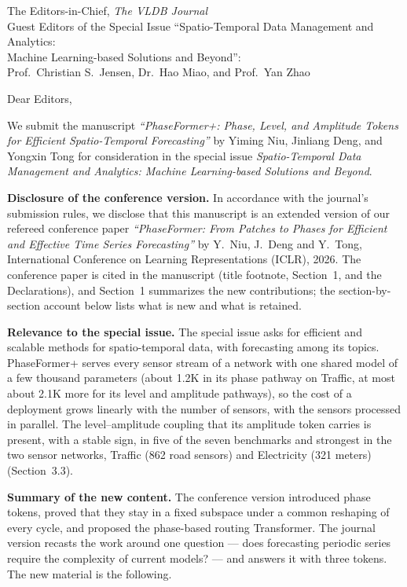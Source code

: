 \documentclass[11pt,a4paper]{letter}
\date{October 2026}
\begin{document}
\begin{letter}{The Editors-in-Chief, \emph{The VLDB Journal}\\
Guest Editors of the Special Issue ``Spatio-Temporal Data Management and Analytics:\\
Machine Learning-based Solutions and Beyond'':\\
Prof.~Christian S.~Jensen, Dr.~Hao Miao, and Prof.~Yan Zhao}

\opening{Dear Editors,}

We submit the manuscript \emph{``PhaseFormer+: Phase, Level, and Amplitude Tokens for Efficient Spatio-Temporal Forecasting''} by Yiming Niu, Jinliang Deng, and Yongxin Tong for consideration in the special issue \emph{Spatio-Temporal Data Management and Analytics: Machine Learning-based Solutions and Beyond}.

\textbf{Disclosure of the conference version.} In accordance with the journal's submission rules, we disclose that this manuscript is an extended version of our refereed conference paper \emph{``PhaseFormer: From Patches to Phases for Efficient and Effective Time Series Forecasting''} by Y.~Niu, J.~Deng and Y.~Tong, International Conference on Learning Representations (ICLR), 2026. The conference paper is cited in the manuscript (title footnote, Section~1, and the Declarations), and Section~1 summarizes the new contributions; the section-by-section account below lists what is new and what is retained.

\textbf{Relevance to the special issue.} The special issue asks for efficient and scalable methods for spatio-temporal data, with forecasting among its topics. PhaseFormer+ serves every sensor stream of a network with one shared model of a few thousand parameters (about 1.2K in its phase pathway on Traffic, at most about 2.1K more for its level and amplitude pathways), so the cost of a deployment grows linearly with the number of sensors, with the sensors processed in parallel. The level--amplitude coupling that its amplitude token carries is present, with a stable sign, in five of the seven benchmarks and strongest in the two sensor networks, Traffic (862 road sensors) and Electricity (321 meters) (Section~3.3).

\textbf{Summary of the new content.} The conference version introduced phase tokens, proved that they stay in a fixed subspace under a common reshaping of every cycle, and proposed the phase-based routing Transformer. The journal version recasts the work around one question --- does forecasting periodic series require the complexity of current models? --- and answers it with three tokens. The new material is the following.


\end{letter}
\end{document}
